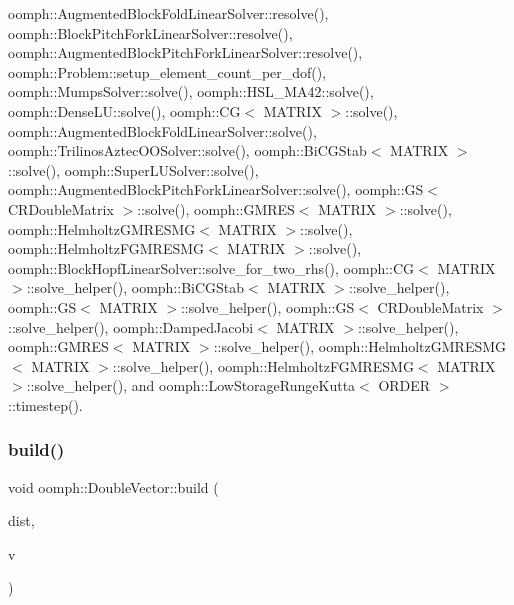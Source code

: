 oomph\+::\+Augmented\+Block\+Fold\+Linear\+Solver\+::resolve(), oomph\+::\+Block\+Pitch\+Fork\+Linear\+Solver\+::resolve(), oomph\+::\+Augmented\+Block\+Pitch\+Fork\+Linear\+Solver\+::resolve(), oomph\+::\+Problem\+::setup\+\_\+element\+\_\+count\+\_\+per\+\_\+dof(), oomph\+::\+Mumps\+Solver\+::solve(), oomph\+::\+H\+S\+L\+\_\+\+M\+A42\+::solve(), oomph\+::\+Dense\+L\+U\+::solve(), oomph\+::\+C\+G$<$ M\+A\+T\+R\+I\+X $>$\+::solve(), oomph\+::\+Augmented\+Block\+Fold\+Linear\+Solver\+::solve(), oomph\+::\+Trilinos\+Aztec\+O\+O\+Solver\+::solve(), oomph\+::\+Bi\+C\+G\+Stab$<$ M\+A\+T\+R\+I\+X $>$\+::solve(), oomph\+::\+Super\+L\+U\+Solver\+::solve(), oomph\+::\+Augmented\+Block\+Pitch\+Fork\+Linear\+Solver\+::solve(), oomph\+::\+G\+S$<$ C\+R\+Double\+Matrix $>$\+::solve(), oomph\+::\+G\+M\+R\+E\+S$<$ M\+A\+T\+R\+I\+X $>$\+::solve(), oomph\+::\+Helmholtz\+G\+M\+R\+E\+S\+M\+G$<$ M\+A\+T\+R\+I\+X $>$\+::solve(), oomph\+::\+Helmholtz\+F\+G\+M\+R\+E\+S\+M\+G$<$ M\+A\+T\+R\+I\+X $>$\+::solve(), oomph\+::\+Block\+Hopf\+Linear\+Solver\+::solve\+\_\+for\+\_\+two\+\_\+rhs(), oomph\+::\+C\+G$<$ M\+A\+T\+R\+I\+X $>$\+::solve\+\_\+helper(), oomph\+::\+Bi\+C\+G\+Stab$<$ M\+A\+T\+R\+I\+X $>$\+::solve\+\_\+helper(), oomph\+::\+G\+S$<$ M\+A\+T\+R\+I\+X $>$\+::solve\+\_\+helper(), oomph\+::\+G\+S$<$ C\+R\+Double\+Matrix $>$\+::solve\+\_\+helper(), oomph\+::\+Damped\+Jacobi$<$ M\+A\+T\+R\+I\+X $>$\+::solve\+\_\+helper(), oomph\+::\+G\+M\+R\+E\+S$<$ M\+A\+T\+R\+I\+X $>$\+::solve\+\_\+helper(), oomph\+::\+Helmholtz\+G\+M\+R\+E\+S\+M\+G$<$ M\+A\+T\+R\+I\+X $>$\+::solve\+\_\+helper(), oomph\+::\+Helmholtz\+F\+G\+M\+R\+E\+S\+M\+G$<$ M\+A\+T\+R\+I\+X $>$\+::solve\+\_\+helper(), and oomph\+::\+Low\+Storage\+Runge\+Kutta$<$ O\+R\+D\+E\+R $>$\+::timestep().

\mbox{\label{classoomph_1_1DoubleVector_ad22d075ba35995e26f40209de1b25746}} 
\subsubsection{\texorpdfstring{build()}{build()}\hspace{0.1cm}{\footnotesize\ttfamily [2/5]}}
{\footnotesize\ttfamily void oomph\+::\+Double\+Vector\+::build (\begin{DoxyParamCaption}\item[{const \hyperlink{classoomph_1_1LinearAlgebraDistribution}{Linear\+Algebra\+Distribution} \&}]{dist,  }\item[{const double \&}]{v }\end{DoxyParamCaption})\hspace{0.3cm}{\ttfamily [inline]}}



